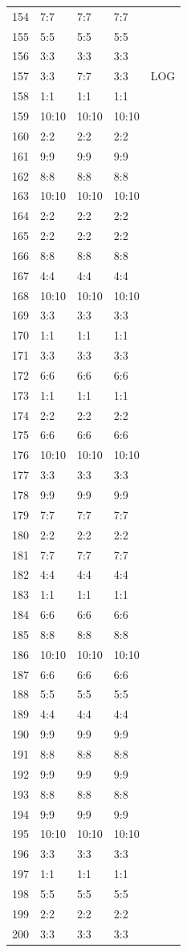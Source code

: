 \documentclass{report}
\begin{document}
\begin{center}
\begin{longtable}{|l|l|l|l|l|}
154&7:7&7:7&7:7&\\
155&5:5&5:5&5:5&\\
156&3:3&3:3&3:3&\\
157&3:3&7:7&3:3&LOG\\
158&1:1&1:1&1:1&\\
159&10:10&10:10&10:10&\\
160&2:2&2:2&2:2&\\
161&9:9&9:9&9:9&\\
162&8:8&8:8&8:8&\\
163&10:10&10:10&10:10&\\
164&2:2&2:2&2:2&\\
165&2:2&2:2&2:2&\\
166&8:8&8:8&8:8&\\
167&4:4&4:4&4:4&\\
168&10:10&10:10&10:10&\\
169&3:3&3:3&3:3&\\
170&1:1&1:1&1:1&\\
171&3:3&3:3&3:3&\\
172&6:6&6:6&6:6&\\
173&1:1&1:1&1:1&\\
174&2:2&2:2&2:2&\\
175&6:6&6:6&6:6&\\
176&10:10&10:10&10:10&\\
177&3:3&3:3&3:3&\\
178&9:9&9:9&9:9&\\
179&7:7&7:7&7:7&\\
180&2:2&2:2&2:2&\\
181&7:7&7:7&7:7&\\
182&4:4&4:4&4:4&\\
183&1:1&1:1&1:1&\\
184&6:6&6:6&6:6&\\
185&8:8&8:8&8:8&\\
186&10:10&10:10&10:10&\\
187&6:6&6:6&6:6&\\
188&5:5&5:5&5:5&\\
189&4:4&4:4&4:4&\\
190&9:9&9:9&9:9&\\
191&8:8&8:8&8:8&\\
192&9:9&9:9&9:9&\\
193&8:8&8:8&8:8&\\
194&9:9&9:9&9:9&\\
195&10:10&10:10&10:10&\\
196&3:3&3:3&3:3&\\
197&1:1&1:1&1:1&\\
198&5:5&5:5&5:5&\\
199&2:2&2:2&2:2&\\
200&3:3&3:3&3:3&\\
\end{longtable}
\end{center}
\end{document}
